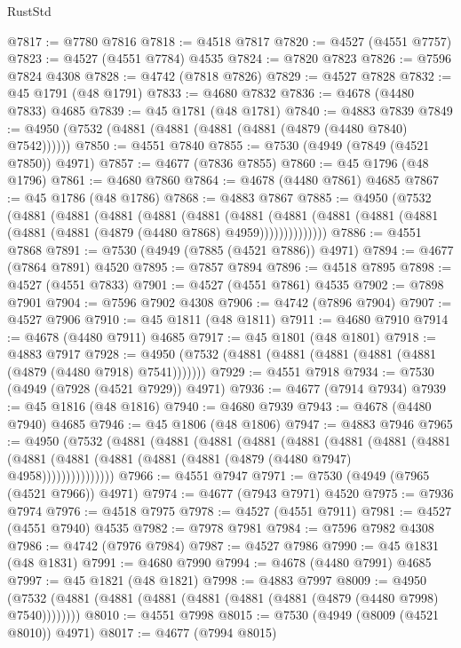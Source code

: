 \begin{lexlean}{RustStd}
\begin{coremodule}
@7817 := @7780 @7816
@7818 := @4518 @7817
@7820 := @4527 (@4551 @7757)
@7823 := @4527 (@4551 @7784) @4535
@7824 := @7820 @7823
@7826 := @7596 @7824 @4308
@7828 := @4742 (@7818 @7826)
@7829 := @4527 @7828
@7832 := @45 @1791 (@48 @1791)
@7833 := @4680 @7832
@7836 := @4678 (@4480 @7833) @4685
@7839 := @45 @1781 (@48 @1781)
@7840 := @4883 @7839
@7849 := @4950 (@7532 (@4881 (@4881 (@4881 (@4881 (@4879 (@4480 @7840) @7542))))))
@7850 := @4551 @7840
@7855 := @7530 (@4949 (@7849 (@4521 @7850)) @4971)
@7857 := @4677 (@7836 @7855)
@7860 := @45 @1796 (@48 @1796)
@7861 := @4680 @7860
@7864 := @4678 (@4480 @7861) @4685
@7867 := @45 @1786 (@48 @1786)
@7868 := @4883 @7867
@7885 := @4950
    (@7532
      (@4881
        (@4881
          (@4881
            (@4881
              (@4881
                (@4881
                  (@4881 (@4881 (@4881 (@4881 (@4881 (@4881 (@4879 (@4480 @7868) @4959))))))))))))))
@7886 := @4551 @7868
@7891 := @7530 (@4949 (@7885 (@4521 @7886)) @4971)
@7894 := @4677 (@7864 @7891) @4520
@7895 := @7857 @7894
@7896 := @4518 @7895
@7898 := @4527 (@4551 @7833)
@7901 := @4527 (@4551 @7861) @4535
@7902 := @7898 @7901
@7904 := @7596 @7902 @4308
@7906 := @4742 (@7896 @7904)
@7907 := @4527 @7906
@7910 := @45 @1811 (@48 @1811)
@7911 := @4680 @7910
@7914 := @4678 (@4480 @7911) @4685
@7917 := @45 @1801 (@48 @1801)
@7918 := @4883 @7917
@7928 := @4950 (@7532 (@4881 (@4881 (@4881 (@4881 (@4881 (@4879 (@4480 @7918) @7541)))))))
@7929 := @4551 @7918
@7934 := @7530 (@4949 (@7928 (@4521 @7929)) @4971)
@7936 := @4677 (@7914 @7934)
@7939 := @45 @1816 (@48 @1816)
@7940 := @4680 @7939
@7943 := @4678 (@4480 @7940) @4685
@7946 := @45 @1806 (@48 @1806)
@7947 := @4883 @7946
@7965 := @4950
    (@7532
      (@4881
        (@4881
          (@4881
            (@4881
              (@4881
                (@4881
                  (@4881
                    (@4881
                      (@4881 (@4881 (@4881 (@4881 (@4881 (@4879 (@4480 @7947) @4958)))))))))))))))
@7966 := @4551 @7947
@7971 := @7530 (@4949 (@7965 (@4521 @7966)) @4971)
@7974 := @4677 (@7943 @7971) @4520
@7975 := @7936 @7974
@7976 := @4518 @7975
@7978 := @4527 (@4551 @7911)
@7981 := @4527 (@4551 @7940) @4535
@7982 := @7978 @7981
@7984 := @7596 @7982 @4308
@7986 := @4742 (@7976 @7984)
@7987 := @4527 @7986
@7990 := @45 @1831 (@48 @1831)
@7991 := @4680 @7990
@7994 := @4678 (@4480 @7991) @4685
@7997 := @45 @1821 (@48 @1821)
@7998 := @4883 @7997
@8009 := @4950 (@7532 (@4881 (@4881 (@4881 (@4881 (@4881 (@4881 (@4879 (@4480 @7998) @7540))))))))
@8010 := @4551 @7998
@8015 := @7530 (@4949 (@8009 (@4521 @8010)) @4971)
@8017 := @4677 (@7994 @8015)

\end{coremodule}
\end{lexlean}
